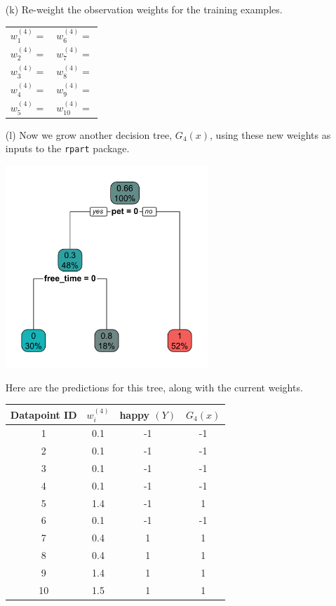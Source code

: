 \begin{enumerate}
\item[(k)] Re-weight the observation weights for the training examples. 
\begin{center}
\begin{tabular}{p{}p{}}
$w_1^{(4)} = $ \hfill & $w_6^{(4)} = $ \hfill \\
$w_2^{(4)} = $ \hfill & $w_7^{(4)} = $ \hfill \\
$w_3^{(4)} = $ \hfill & $w_8^{(4)} = $ \hfill \\
$w_4^{(4)} = $ \hfill & $w_9^{(4)} = $ \hfill \\
$w_5^{(4)} = $ \hfill & $w_{10}^{(4)} = $ \hfill \\
\end{tabular}
\end{center}

\item[(l)] Now we grow another decision tree, $G_4(x)$, using these new weights as inputs to the \texttt{rpart} package. 

\begin{center}
\includegraphics[width=0.6\textwidth]{img/happiness-boosting-tree-4.png}
\end{center}

Here are the predictions for this tree, along with the current weights.

{\small
\begin{center}
\begin{tabular}{cccc}
\toprule
Datapoint ID & $w_i^{(4)}$ & happy $(Y)$ & $G_4(x)$ \\
\midrule
1 & 0.1 & -1 & -1 \\
2 & 0.1 & -1 & -1 \\
3 & 0.1 & -1 & -1 \\
4 & 0.1 & -1 & -1 \\
5 & 1.4 & -1 & 1 \\
6 & 0.1 & -1 & -1 \\
\midrule
7 & 0.4 & 1 & 1 \\
8 & 0.4 & 1 & 1 \\
9 & 1.4 & 1 & 1 \\
10 & 1.5 & 1 & 1 \\
\bottomrule
\end{tabular}
\end{center}
}


\end{enumerate}
